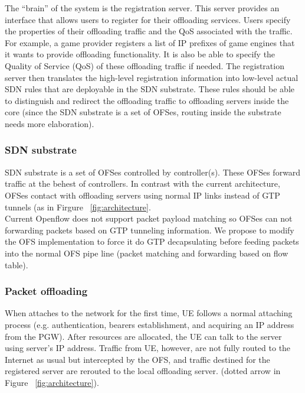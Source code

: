 The “brain” of the system is the registration server. This server provides an interface that allows users to register for their offloading services. Users specify the properties of their offloading traffic and the QoS associated with the traffic. For example, a game provider registers a list of IP prefixes of game engines that it wants to provide offloading functionality. It is also be able to specify the Quality of Service (QoS) of these offloading traffic if needed. The registration server then translates the high-level registration information into low-level actual SDN rules that are deployable in the SDN substrate. These rules should be able to distinguish and redirect the offloading traffic to offloading servers inside the core (since the SDN substrate is a set of OFSes, routing inside the substrate needs more elaboration).

\subsubsection{SDN substrate}
SDN substrate is a set of OFSes controlled by controller(s). These OFSes forward traffic at the behest of controllers. In contrast with the current architecture, OFSes contact with offloading servers using normal IP links instead of GTP tunnels (as in Firgure ~\ref{fig:architecture}. \\
Current Openflow does not support packet payload matching so OFSes can not forwarding packets based on GTP tunneling information. We propose to modify the OFS implementation to force it do GTP decapsulating before feeding packets into the normal OFS pipe line (packet matching and forwarding based on flow table).\\

\subsubsection{Packet offloading}

When attaches to the network for the first time, 
UE follows a normal attaching process (e.g. 
authentication, bearers establishment, and acquiring 
an IP address from the PGW). After resources are 
allocated, the UE can talk to the server using 
server's IP address. Traffic from UE, however, are 
not fully routed to the Internet as usual but intercepted 
by the OFS, and traffic destined for the registered server 
are rerouted to the local offloading server.
(dotted arrow in Figure ~\ref{fig:architecture}).\\

